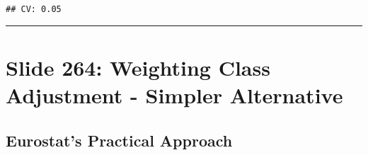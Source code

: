 \documentclass[
]{article}
\begin{document}
\begin{verbatim}
## CV: 0.05
\end{verbatim}

\begin{center}\rule{0.5\linewidth}{0.5pt}\end{center}

\section{Slide 264: Weighting Class Adjustment - Simpler
Alternative}\label{slide-264-weighting-class-adjustment---simpler-alternative}

\subsection{Eurostat's Practical
Approach}\label{eurostats-practical-approach}
\end{document}
